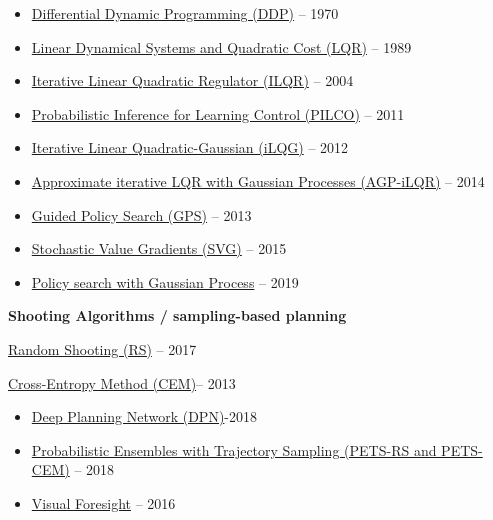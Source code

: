 \documentclass[
  a4paper,
  DIV=11,
  numbers=noendperiod]{scrreprt}
\providecommand{\tightlist}{%
  \setlength{\itemsep}{0pt}\setlength{\parskip}{0pt}}\usepackage{longtable,booktabs,array}
\begin{document}
\begin{itemize}
\tightlist
\item
  \href{https://www.jstor.org/stable/3613752?origin=crossref\&seq=1}{Differential
  Dynamic Programming (DDP)} -- 1970
\item
  \href{http://users.cecs.anu.edu.au/~john/papers/BOOK/B03.PDF}{Linear
  Dynamical Systems and Quadratic Cost (LQR)} -- 1989
\item
  \href{https://homes.cs.washington.edu/~todorov/papers/LiICINCO04.pdf}{Iterative
  Linear Quadratic Regulator (ILQR)} -- 2004
\item
  \href{https://www.ias.informatik.tu-darmstadt.de/uploads/Publications/Deisenroth_ICML_2011.pdf}{Probabilistic
  Inference for Learning Control (PILCO)} -- 2011
\item
  \href{https://homes.cs.washington.edu/~todorov/papers/TassaIROS12.pdf}{Iterative
  Linear Quadratic-Gaussian (iLQG)} -- 2012
\item
  \href{http://citeseerx.ist.psu.edu/viewdoc/download?doi=10.1.1.716.4271\&rep=rep1\&type=pdf}{Approximate
  iterative LQR with Gaussian Processes (AGP-iLQR)} -- 2014
\item
  \href{https://graphics.stanford.edu/projects/gpspaper/gps_full.pdf}{Guided
  Policy Search (GPS)} -- 2013
\item
  \href{https://arxiv.org/abs/1510.09142}{Stochastic Value Gradients
  (SVG)} -- 2015
\item
  \href{https://dl.acm.org/doi/10.5555/3306127.3331874}{Policy search
  with Gaussian Process} -- 2019
\end{itemize}

\textbf{Shooting Algorithms / sampling-based planning}

\href{https://arxiv.org/pdf/1708.02596.pdf}{Random Shooting (RS)} --
2017

\href{https://www.sciencedirect.com/science/article/pii/B9780444538598000035}{Cross-Entropy
Method (CEM)}-- 2013

\begin{itemize}
\tightlist
\item
  \href{https://arxiv.org/abs/1811.04551}{Deep Planning Network
  (DPN)}-2018
\item
  \href{https://arxiv.org/abs/1805.12114}{Probabilistic Ensembles with
  Trajectory Sampling (PETS-RS and PETS-CEM)} -- 2018
\item
  \href{https://arxiv.org/abs/1610.00696}{Visual Foresight} -- 2016
\end{itemize}
\end{document}
